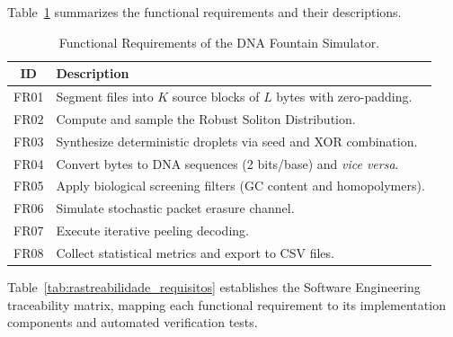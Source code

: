 Table~\ref{tab:requisitos_funcionais} summarizes the functional requirements and their descriptions.

\begin{table}[htbp]
    \centering
    \small
    \caption{Functional Requirements of the DNA Fountain Simulator.}
    \label{tab:requisitos_funcionais}
    \begin{tabular}{cp{11cm}}
        \toprule
        \textbf{ID} & \textbf{Description} \\
        \midrule
        FR01 & Segment files into $K$ source blocks of $L$ bytes with zero-padding. \\
        FR02 & Compute and sample the Robust Soliton Distribution. \\
        FR03 & Synthesize deterministic droplets via seed and XOR combination. \\
        FR04 & Convert bytes to DNA sequences (2 bits/base) and \emph{vice versa}. \\
        FR05 & Apply biological screening filters (GC content and homopolymers). \\
        FR06 & Simulate stochastic packet erasure channel. \\
        FR07 & Execute iterative peeling decoding. \\
        FR08 & Collect statistical metrics and export to CSV files. \\
        \bottomrule
    \end{tabular}
\end{table}

Table~\ref{tab:rastreabilidade_requisitos} establishes the Software Engineering traceability matrix, mapping each functional requirement to its implementation components and automated verification tests.

